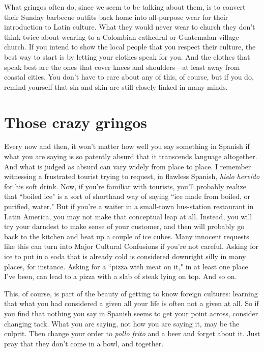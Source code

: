 What gringos often do, since we seem to be talking about
them, is to convert their Sunday barbecue outfits back home into all-purpose wear for their introduction to Latin culture. What they would
never wear to church they don't think twice about wearing to a Colombian cathedral or Guatemalan village church. If you intend to show the
local people that you respect their culture, the best way to start is by
letting your clothes speak for you. And the clothes that speak best are
the ones that cover knees and shoulders---at least away from coastal
cities. You don't have to care about any of this, of course, but if you
do, remind yourself that sin and skin are still closely linked in many
minds.

\section{Those crazy gringos}

Every now and then, it won't matter how well you say something in Spanish if what you are saying is so patently absurd that it
transcends language altogether. And what is judged as absurd can vary
widely from place to place. I remember witnessing a frustrated tourist trying to request, in flawless Spanish, \emph{hielo hervido} for his soft
drink. Now, if you're familiar with tourists, you'll probably realize that
``boiled ice" is a sort of shorthand way of saying ``ice made from boiled,
or purified, water." But if you're a waiter in a small-town bus-station
restaurant in Latin America, you may not make that conceptual leap at
all. Instead, you will try your darndest to make sense of your customer,
and then will probably go back to the kitchen and heat up a couple of
ice cubes. Many innocent requests like this can turn into Major Cultural Confusions if you're not careful. Asking for ice to put in a soda
that is already cold is considered downright silly in many places, for
instance. Asking for a ``pizza with meat on it," in at least one place I've
been, can lead to a pizza with a slab of steak lying on top. And so on.

This, of course, is part of the beauty of getting to know foreign
cultures: learning that what you had considered a given all your life is
often not a given at all. So if you find that nothing you say in Spanish
seems to get your point across, consider changing tack. What you are
saying, not how you are saying it, may be the culprit. Then change
your order to \emph{pollo frito} and a beer and forget about it. Just pray that
they don't come in a bowl, and together.


